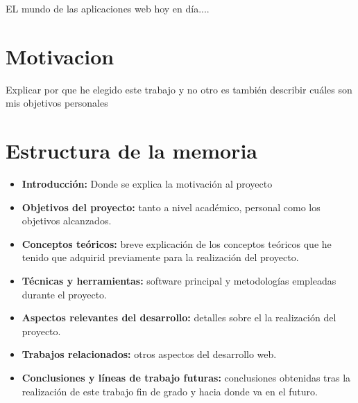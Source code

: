 
EL mundo de las aplicaciones web hoy en día....

\section{Motivacion}\label{Motivacion}

Explicar por que he elegido este trabajo y no otro es también describir cuáles son mis objetivos personales 

\section{Estructura de la memoria}\label{estructura-de-la-memoria}

\begin{itemize}
\tightlist
\item
  \textbf{Introducción:} Donde se explica la motivación al proyecto
\item
  \textbf{Objetivos del proyecto:} tanto a nivel académico, personal como los objetivos alcanzados.
\item
  \textbf{Conceptos teóricos:} breve explicación de los conceptos
  teóricos que he tenido que adquirid previamente para la realización del proyecto.
\item
  \textbf{Técnicas y herramientas:} software principal y metodologías empleadas durante el proyecto.
\item
  \textbf{Aspectos relevantes del desarrollo:} detalles sobre el la realización del proyecto.
\item
  \textbf{Trabajos relacionados:} otros aspectos del desarrollo web.
\item
  \textbf{Conclusiones y líneas de trabajo futuras:} conclusiones
  obtenidas tras la realización de este trabajo fin de grado y hacia donde va en el futuro.
\end{itemize}
